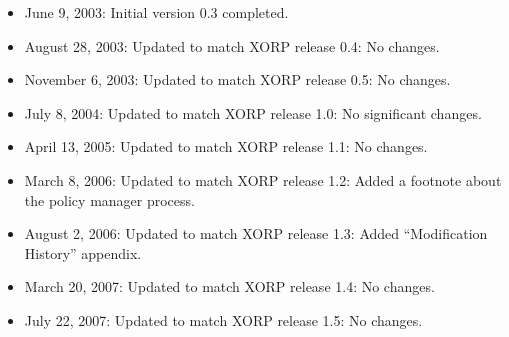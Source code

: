 \documentclass[11pt]{article}
\begin{document}
\begin{itemize}

  \item June 9, 2003: Initial version 0.3 completed.

  \item August 28, 2003: Updated to match XORP release 0.4:
   No changes.

  \item November 6, 2003: Updated to match XORP release 0.5:
   No changes.

  \item July 8, 2004: Updated to match XORP release 1.0:
   No significant changes.

  \item April 13, 2005: Updated to match XORP release 1.1:
   No changes.

  \item March 8, 2006: Updated to match XORP release 1.2:
   Added a footnote about the policy manager process.

  \item August 2, 2006: Updated to match XORP release 1.3:
  Added ``Modification History'' appendix.

  \item March 20, 2007: Updated to match XORP release 1.4:
   No changes.

  \item July 22, 2007: Updated to match XORP release 1.5:
   No changes.

\end{itemize}




\end{document}
